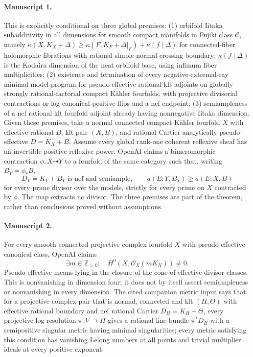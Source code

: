 \documentclass[11pt]{article}
\begin{document}
\paragraph{Manuscript 1.}
This is explicitly conditional on three global premises: (1) orbifold Iitaka subadditivity in all dimensions for smooth compact manifolds in Fujiki class $\mathcal C$, namely $\kappa(X,K_X+\Delta)\ge\kappa(F,K_F+\Delta|_F)+\kappa(f\mid\Delta)$ for connected-fiber holomorphic fibrations with rational simple-normal-crossing boundary; $\kappa(f\mid\Delta)$ is the Kodaira dimension of the neat orbifold base, using infimum fiber multiplicities; (2) existence and termination of every negative-extremal-ray minimal model program for pseudo-effective rational klt adjoints on globally strongly rational-factorial compact Kähler fourfolds, with projective divisorial contractions or log-canonical-positive flips and a nef endpoint; (3) semiampleness of a nef rational klt fourfold adjoint already having nonnegative Iitaka dimension.
Given these premises, take a normal connected compact Kähler fourfold $X$ with effective rational $B$, klt pair $(X,B)$, and rational Cartier analytically pseudo-effective $D=K_X+B$. Assume every global rank-one coherent reflexive sheaf has an invertible positive reflexive power. OpenAI claims a bimeromorphic contraction $\phi:X\dashrightarrow Y$ to a fourfold of the same category such that, writing $B_Y=\phi_*B$,
\[
D_Y=K_Y+B_Y\text{ is nef and semiample},\qquad
 a(E;Y,B_Y)\ge a(E;X,B)
\]
for every prime divisor over the models, strictly for every prime on $X$ contracted by $\phi$. The map extracts no divisor. The three premises are part of the theorem, rather than conclusions proved without assumptions.

\paragraph{Manuscript 2.}
For every smooth connected projective complex fourfold $X$ with pseudo-effective canonical class, OpenAI claims
\[
\exists m\in\mathbb Z_{>0}:\quad H^0(X,\mathcal O_X(mK_X))\ne0.
\]
Pseudo-effective means lying in the closure of the cone of effective divisor classes. This is nonvanishing in dimension four; it does not by itself assert semiampleness or nonvanishing in every dimension.
The cited companion metric input says that for a projective complex pair that is normal, connected and klt $(H,\Theta)$ with effective rational boundary and nef rational Cartier $D_H=K_H+\Theta$, every projective log resolution $\pi:V\to H$ gives a rational line bundle $\pi^*D_H$ with a semipositive singular metric having minimal singularities; every metric satisfying this condition has vanishing Lelong numbers at all points and trivial multiplier ideals at every positive exponent.
\end{document}
